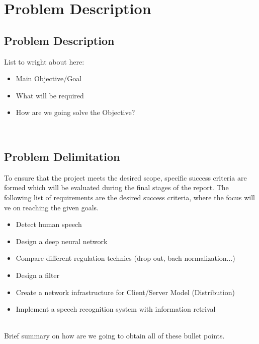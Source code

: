 \chapter{Problem Description}\label{ch:problem_description}

\section{Problem Description}
List to wright about here:

\begin{itemize}
	\item Main Objective/Goal
	\item What will be required
	\item How are we going solve the Objective?
\end{itemize}

\\


\section{Problem Delimitation}
To ensure that the project meets the desired scope, specific success criteria are formed which will be evaluated during the final stages of the report. The following list of requirements are the desired success criteria, where the focus will ve on reaching the given goals.

\begin{itemize}
  \item Detect human speech
  \item Design a deep neural network
  \item Compare different regulation technics (drop out, bach normalization...)
  \item Design a filter
  \item Create a network infrastructure for Client/Server Model (Distribution)
  \item Implement a speech recognition system with information retrival
\end{itemize}
\\
Brief summary on how are we going to obtain all of these bullet points.
